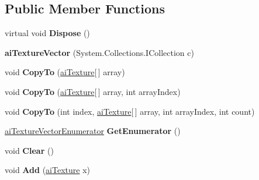 \subsection*{Public Member Functions}
\begin{DoxyCompactItemize}
\item 
\hypertarget{classai_texture_vector_a3751a7cd22e3caa655d86c0bd606a8f3}{virtual void {\bfseries Dispose} ()}\label{classai_texture_vector_a3751a7cd22e3caa655d86c0bd606a8f3}

\item 
\hypertarget{classai_texture_vector_a9ed63ca907af1f05e670f319265933aa}{{\bfseries ai\+Texture\+Vector} (System.\+Collections.\+I\+Collection c)}\label{classai_texture_vector_a9ed63ca907af1f05e670f319265933aa}

\item 
\hypertarget{classai_texture_vector_a8ec530aee7b2d069db9190c9d3c38693}{void {\bfseries Copy\+To} (\hyperlink{structai_texture}{ai\+Texture}\mbox{[}$\,$\mbox{]} array)}\label{classai_texture_vector_a8ec530aee7b2d069db9190c9d3c38693}

\item 
\hypertarget{classai_texture_vector_a5ab656a423e4576b87e7ff6d57adf32c}{void {\bfseries Copy\+To} (\hyperlink{structai_texture}{ai\+Texture}\mbox{[}$\,$\mbox{]} array, int array\+Index)}\label{classai_texture_vector_a5ab656a423e4576b87e7ff6d57adf32c}

\item 
\hypertarget{classai_texture_vector_a5b73fbf501bdbd67ae1de0aeb358573f}{void {\bfseries Copy\+To} (int index, \hyperlink{structai_texture}{ai\+Texture}\mbox{[}$\,$\mbox{]} array, int array\+Index, int count)}\label{classai_texture_vector_a5b73fbf501bdbd67ae1de0aeb358573f}

\item 
\hypertarget{classai_texture_vector_a1324e6be202ca06029752e39b82423ad}{\hyperlink{classai_texture_vector_1_1ai_texture_vector_enumerator}{ai\+Texture\+Vector\+Enumerator} {\bfseries Get\+Enumerator} ()}\label{classai_texture_vector_a1324e6be202ca06029752e39b82423ad}

\item 
\hypertarget{classai_texture_vector_a4bf1b9f2376df1184dafdc5d83a7358a}{void {\bfseries Clear} ()}\label{classai_texture_vector_a4bf1b9f2376df1184dafdc5d83a7358a}

\item 
\hypertarget{classai_texture_vector_a8843669d06f1bd679dca564c0ccd28d0}{void {\bfseries Add} (\hyperlink{structai_texture}{ai\+Texture} x)}\label{classai_texture_vector_a8843669d06f1bd679dca564c0ccd28d0}


\end{DoxyCompactItemize}
